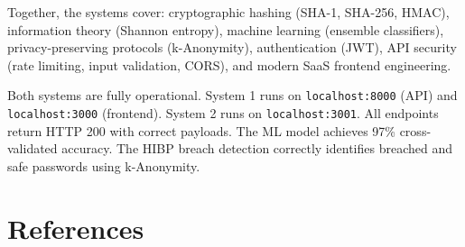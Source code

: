 \documentclass[12pt,a4paper]{article}
\begin{document}
Together, the systems cover: cryptographic hashing (SHA-1, SHA-256, HMAC),
information theory (Shannon entropy), machine learning (ensemble classifiers),
privacy-preserving protocols (k-Anonymity), authentication (JWT),
API security (rate limiting, input validation, CORS), and modern SaaS
frontend engineering.

\begin{successbox}[title={Operational Status}]
Both systems are fully operational. System 1 runs on \texttt{localhost:8000}
(API) and \texttt{localhost:3000} (frontend). System 2 runs on
\texttt{localhost:3001}. All endpoints return HTTP 200 with correct payloads.
The ML model achieves 97\% cross-validated accuracy. The HIBP breach detection
correctly identifies breached and safe passwords using k-Anonymity.
\end{successbox}

\section*{References}
\end{document}
